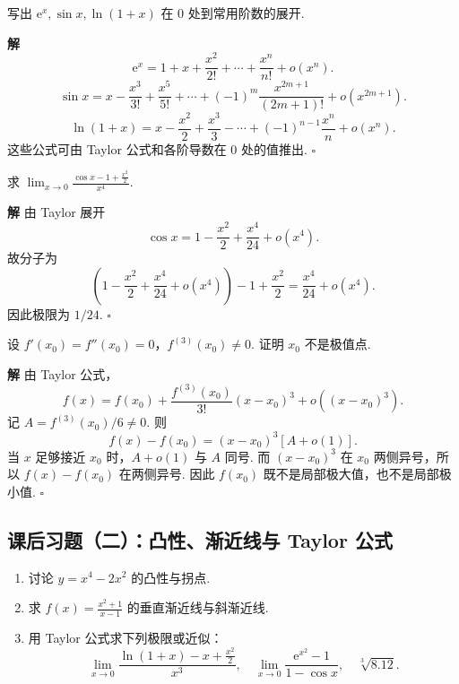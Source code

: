 \documentclass[fontset=fandol]{ctexart}
\newenvironment{solution}{\par\noindent\textbf{解}\quad}{\hfill$\square$\par\vspace{0.8em}}
\newcommand{\ee}{\mathrm{e}}
\begin{document}
\begin{example}[Maclaurin 公式]
写出 $\ee^x,\sin x,\ln(1+x)$ 在 $0$ 处到常用阶数的展开.
\end{example}
\begin{solution}
\[
\ee^x=1+x+\frac{x^2}{2!}+\cdots+\frac{x^n}{n!}+o(x^n).
\]
\[
\sin x=x-\frac{x^3}{3!}+\frac{x^5}{5!}+\cdots+(-1)^m\frac{x^{2m+1}}{(2m+1)!}+o(x^{2m+1}).
\]
\[
\ln(1+x)=x-\frac{x^2}{2}+\frac{x^3}{3}-\cdots+(-1)^{n-1}\frac{x^n}{n}+o(x^n).
\]
这些公式可由 Taylor 公式和各阶导数在 $0$ 处的值推出.
\end{solution}

\begin{example}[极限]
求 $\displaystyle\lim_{x\to0}\frac{\cos x-1+\frac{x^2}{2}}{x^4}$.
\end{example}
\begin{solution}
由 Taylor 展开
\[
\cos x=1-\frac{x^2}{2}+\frac{x^4}{24}+o(x^4).
\]
故分子为
\[
\left(1-\frac{x^2}{2}+\frac{x^4}{24}+o(x^4)\right)-1+\frac{x^2}{2}
=\frac{x^4}{24}+o(x^4).
\]
因此极限为 $1/24$.
\end{solution}

\begin{example}
设 $f'(x_0)=f''(x_0)=0$，$f^{(3)}(x_0)\neq0$. 证明 $x_0$ 不是极值点.
\end{example}
\begin{solution}
由 Taylor 公式，
\[
f(x)=f(x_0)+\frac{f^{(3)}(x_0)}{3!}(x-x_0)^3+o((x-x_0)^3).
\]
记 $A=f^{(3)}(x_0)/6\neq0$. 则
\[
f(x)-f(x_0)=(x-x_0)^3[A+o(1)].
\]
当 $x$ 足够接近 $x_0$ 时，$A+o(1)$ 与 $A$ 同号. 而 $(x-x_0)^3$ 在 $x_0$ 两侧异号，所以 $f(x)-f(x_0)$ 在两侧异号. 因此 $f(x_0)$ 既不是局部极大值，也不是局部极小值.
\end{solution}

\subsection{课后习题（二）：凸性、渐近线与 Taylor 公式}
\begin{enumerate}[label=\textbf{练习\arabic*.},leftmargin=2.2em]
\item 讨论 $y=x^4-2x^2$ 的凸性与拐点.
\item 求 $f(x)=\frac{x^2+1}{x-1}$ 的垂直渐近线与斜渐近线.
\item 用 Taylor 公式求下列极限或近似：
\[
\lim_{x\to0}\frac{\ln(1+x)-x+\frac{x^2}{2}}{x^3},\quad
\lim_{x\to0}\frac{\ee^{x^2}-1}{1-\cos x},\quad
\sqrt[3]{8.12}.
\]
\end{enumerate}
\end{document}
